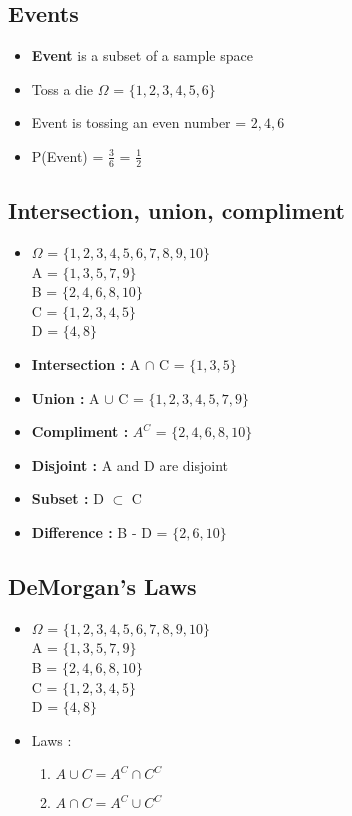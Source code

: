 \documentclass[13pt]{book}
\begin{document}
\subsection{Events}
\begin{itemize}
  \item \textbf{Event} is a subset of a sample space
  \item Toss a die \(\Omega\) = \(\{1,2,3,4,5,6\}\)
  \item Event is tossing an even number = \({2,4,6}\)
  \item P(Event) = \(\frac{3}{6}\) = \(\frac{1}{2}\)
\end{itemize}
\subsection{Intersection, union, compliment}
\begin{itemize}
\item \(\Omega\) = \(\{1,2,3,4,5,6,7,8,9,10\}\) \\
  A = \(\{1,3,5,7,9\}\) \\
  B = \(\{2,4,6,8,10\}\) \\
  C = \(\{1,2,3,4,5\}\) \\
  D = \(\{4,8\}\) 
\item \textbf{Intersection : } A \(\cap\) C = \(\{1,3,5\}\)
\item \textbf{Union : } A \(\cup\) C = \(\{1,2,3,4,5,7,9\}\)
\item \textbf{Compliment : } \(A^C\) = \(\{2,4,6,8,10\}\)
\item \textbf{Disjoint :} A and D are disjoint
\item \textbf{Subset : } D \(\subset\) C
\item \textbf{Difference : }  B - D = \(\{2,6,10\}\)
\end{itemize}
\subsection{DeMorgan's Laws}
\begin{itemize}
  \item \(\Omega\) = \(\{1,2,3,4,5,6,7,8,9,10\}\) \\
  A = \(\{1,3,5,7,9\}\) \\
  B = \(\{2,4,6,8,10\}\) \\
  C = \(\{1,2,3,4,5\}\) \\
  D = \(\{4,8\}\)
    \item Laws :
  \begin{enumerate}
    \item \(A \cup C = A^C \cap C^C\)
    \item \(A \cap C = A^C \cup C^C\)
    \end{enumerate}
\end{itemize}
\end{document}
